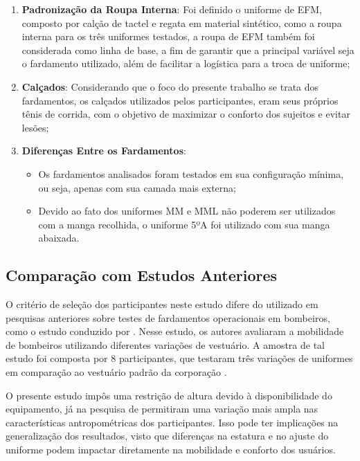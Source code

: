 \begin{enumerate}[label=\Roman*]
    \item \textbf{Padronização da Roupa Interna}: Foi definido o uniforme de \acrfull{EFM}, composto por calção de tactel e regata em material sintético, como a roupa interna para os três uniformes testados, a roupa de \acrshort{EFM} também foi considerada como linha de base, a fim de garantir que a principal variável seja o fardamento utilizado, além de facilitar a logística para a troca de uniforme;
    \item \textbf{Calçados}: Considerando que o foco do presente trabalho se trata dos fardamentos, os calçados utilizados pelos participantes, eram seus próprios tênis de corrida, com o objetivo de maximizar o conforto dos sujeitos e evitar lesões;
    \item \textbf{Diferenças Entre os Fardamentos}: 
    \begin{itemize}
        \item Os fardamentos analisados foram testados em sua configuração mínima, ou seja, apenas com sua camada mais externa;
        \item Devido ao fato dos uniformes \acrshort{MM} e \acrshort{MML} não poderem ser utilizados com a manga recolhida, o uniforme 5ºA foi utilizado com sua manga abaixada.
    \end{itemize}
     
\end{enumerate}

\subsection{Comparação com Estudos Anteriores}

O critério de seleção dos participantes neste estudo difere do utilizado em pesquisas anteriores sobre testes de fardamentos operacionais em bombeiros, como o estudo conduzido por \textcite{orr2019impact}. Nesse estudo, os autores avaliaram a mobilidade de bombeiros utilizando diferentes variações de vestuário. A amostra de tal estudo foi composta por 8 participantes, que testaram três variações de uniformes em comparação ao vestuário padrão da corporação \cite{orr2019impact}.

\tab O presente estudo impôs uma restrição de altura devido à disponibilidade do equipamento, já na pesquisa de \textcite{orr2019impact} permitiram uma variação mais ampla nas características antropométricas dos participantes. Isso pode ter implicações na generalização dos resultados, visto que diferenças na estatura e no ajuste do uniforme podem impactar diretamente na mobilidade e conforto dos usuários.

